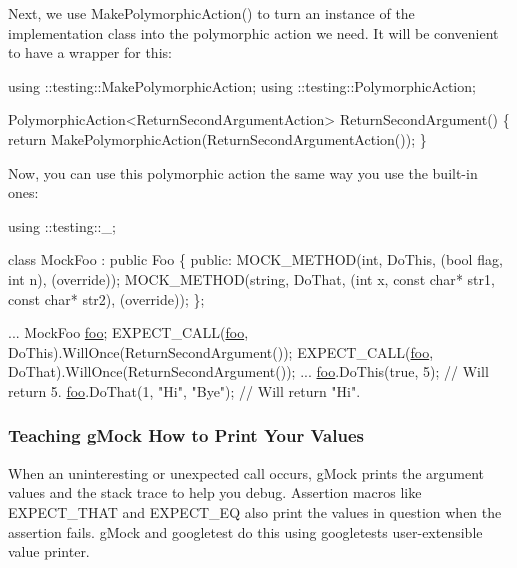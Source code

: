 Next, we use {\ttfamily Make\+Polymorphic\+Action()} to turn an instance of the implementation class into the polymorphic action we need. It will be convenient to have a wrapper for this\+:


\begin{DoxyCode}
using ::testing::MakePolymorphicAction;
using ::testing::PolymorphicAction;

PolymorphicAction<ReturnSecondArgumentAction> ReturnSecondArgument() \{
  \textcolor{keywordflow}{return} MakePolymorphicAction(ReturnSecondArgumentAction());
\}
\end{DoxyCode}


Now, you can use this polymorphic action the same way you use the built-\/in ones\+:


\begin{DoxyCode}
using ::testing::\_;

\textcolor{keyword}{class }MockFoo : \textcolor{keyword}{public} Foo \{
 \textcolor{keyword}{public}:
  MOCK\_METHOD(\textcolor{keywordtype}{int}, DoThis, (\textcolor{keywordtype}{bool} flag, \textcolor{keywordtype}{int} n), (\textcolor{keyword}{override}));
  MOCK\_METHOD(\textcolor{keywordtype}{string}, DoThat, (\textcolor{keywordtype}{int} x, \textcolor{keyword}{const} \textcolor{keywordtype}{char}* str1, \textcolor{keyword}{const} \textcolor{keywordtype}{char}* str2),
              (\textcolor{keyword}{override}));
\};

  ...
  MockFoo \mbox{\hyperlink{namespacefoo}{foo}};
  EXPECT\_CALL(\mbox{\hyperlink{namespacefoo}{foo}}, DoThis).WillOnce(ReturnSecondArgument());
  EXPECT\_CALL(\mbox{\hyperlink{namespacefoo}{foo}}, DoThat).WillOnce(ReturnSecondArgument());
  ...
  \mbox{\hyperlink{namespacefoo}{foo}}.DoThis(\textcolor{keyword}{true}, 5);  \textcolor{comment}{// Will return 5.}
  \mbox{\hyperlink{namespacefoo}{foo}}.DoThat(1, \textcolor{stringliteral}{"Hi"}, \textcolor{stringliteral}{"Bye"});  \textcolor{comment}{// Will return "Hi".}
\end{DoxyCode}


\subsubsection*{Teaching g\+Mock How to Print Your Values}

When an uninteresting or unexpected call occurs, g\+Mock prints the argument values and the stack trace to help you debug. Assertion macros like {\ttfamily E\+X\+P\+E\+C\+T\+\_\+\+T\+H\+AT} and {\ttfamily E\+X\+P\+E\+C\+T\+\_\+\+EQ} also print the values in question when the assertion fails. g\+Mock and googletest do this using googletest\textquotesingle{}s user-\/extensible value printer.

